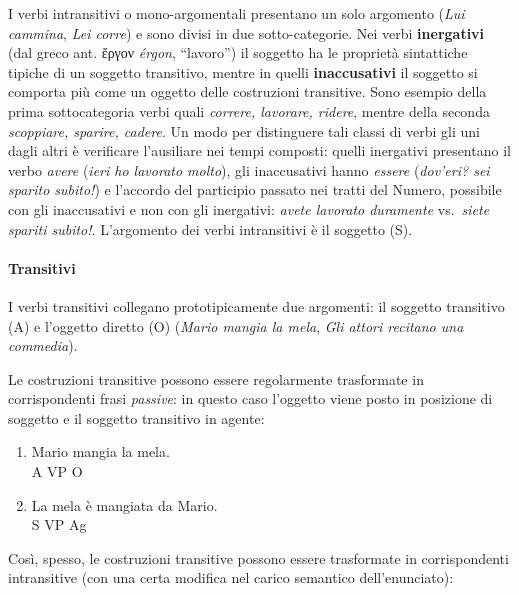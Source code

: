\documentclass[a4paper,twoside,11pt,chapterprefix=false,bibliography=totocnumbered,listof=flat]{scrbook}
\let\oldparagraph\paragraph
\renewcommand{\paragraph}[1]{\oldparagraph{#1}\mbox{}}
\begin{document}
I verbi intransitivi o mono-argomentali presentano un solo argomento
(\emph{Lui cammina}, \emph{Lei corre}) e sono divisi in due
sotto-categorie. Nei verbi \textbf{inergativi} (dal greco ant. ἔργον
\emph{érgon}, \enquote{lavoro}) il soggetto ha le proprietà sintattiche
tipiche di un soggetto transitivo, mentre in quelli
\textbf{inaccusativi} il soggetto si comporta più come un oggetto delle
costruzioni transitive. Sono esempio della prima sottocategoria verbi
quali \emph{correre, lavorare, ridere}, mentre della seconda
\emph{scoppiare, sparire, cadere}. Un modo per distinguere tali classi
di verbi gli uni dagli altri è verificare l'ausiliare nei tempi
composti: quelli inergativi presentano il verbo \emph{avere} (\emph{ieri
ho lavorato molto}), gli inaccusativi hanno \emph{essere}
(\emph{dov'eri? sei sparito subito!}) e l'accordo del participio passato
nei tratti del Numero, possibile con gli inaccusativi e non con gli
inergativi: \emph{avete lavorato duramente} vs.~\emph{siete spariti
subito!}. L'argomento dei verbi intransitivi è il soggetto (S).

\hypertarget{transitivi}{%
\paragraph{Transitivi}\label{transitivi}}

I verbi transitivi collegano prototipicamente due argomenti: il soggetto
transitivo (A) e l'oggetto diretto (O) (\emph{Mario mangia la mela},
\emph{Gli attori recitano una commedia}).

Le costruzioni transitive possono essere regolarmente trasformate in
corrispondenti frasi \emph{passive}: in questo caso l'oggetto viene
posto in posizione di soggetto e il soggetto transitivo in agente:

\begin{enumerate}
\def\labelenumi{(\arabic{enumi})}
\setcounter{enumi}{1}
\item
  \gll    Mario mangia la mela.\\
  A VP O\\
  \glt  
\item
  \gll    La mela è mangiata da Mario.\\
  S VP Ag\\
  \glt  
\end{enumerate}

Così, spesso, le costruzioni transitive possono essere trasformate in
corrispondenti intransitive (con una certa modifica nel carico semantico
dell'enunciato):
\end{document}
